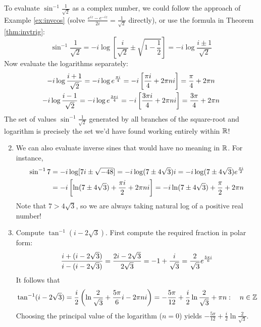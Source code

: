\begin{examples}{}{}
	\exstart To evaluate $\sin^{-1}\frac 1{\sqrt 2}$ as a complex number, we could follow the approach of Example \ref{ex:invcos} (solve $\frac{e^{iz}-e^{-iz}}{2i}=\frac 1{\sqrt 2}$ directly), or use the formula in Theorem \ref{thm:invtrig}:
  \[
  	\sin^{-1}\frac 1{\sqrt 2} =-i\log\left[\frac i{\sqrt 2}\pm \sqrt{1-\frac 12}\right] =-i\log\frac{i\pm 1}{\sqrt 2}
  \]
  Now evaluate the logarithms separately:
  \begin{gather*}
	  -i\log\frac{i+1}{\sqrt 2} =-i\log e^{\frac{\pi i}{4}} =-i\left[\frac{\pi i}4+2\pi ni\right] =\frac\pi 4+2\pi n\\
	  -i\log\frac{i-1}{\sqrt 2} =-i\log e^{\frac{3\pi i}{4}} =-i\left[\frac{3\pi i}4+2\pi ni\right] =\frac{3\pi}4+2\pi n
  \end{gather*}
  The set of values $\sin^{-1}\frac 1{\sqrt 2}$ generated by all branches of the square-root and logarithm is precisely the set we'd have found working entirely within $\mathbb{R}$!
  
	\begin{enumerate}\setcounter{enumi}{1}
	  \item We can also evaluate inverse sines that would have no meaning in $\mathbb{R}$. For instance,
	  \begin{align*}
	  	\sin^{-1}7&=-i\log[7i\pm\sqrt{-48}] =-i\log(7\pm 4\sqrt 3)i =-i\log (7\pm 4\sqrt 3)e^{\frac{\pi i}{2}}\\
	  	&=-i\left[\ln(7\pm 4\sqrt 3)+\frac{\pi i}2+2\pi ni\right] =-i\ln(7\pm 4\sqrt 3)+\frac\pi 2+2\pi n
	  \end{align*}
	  Note that $7>4\sqrt 3$, so we are always taking natural log of a positive real number!
	  
	  \item\label{ex:taninv} Compute $\tan^{-1}(i-2\sqrt 3)$. First compute the required fraction in polar form:
	  \[
	  	\frac{i+(i-2\sqrt 3)}{i-(i-2\sqrt 3)} =\frac{2i-2\sqrt 3}{2\sqrt 3}=-1+\frac i{\sqrt 3}=\frac 2{\sqrt 3}e^{\frac{5\pi i}{6}}
	  \]
	  It follows that
	  \[
	  	\tan^{-1}(i-2\sqrt 3)=\frac i2\left(\ln\frac 2{\sqrt 3}+\frac{5\pi}6i-2\pi ni\right) =-\frac{5\pi}{12}+\frac i2\ln\frac 2{\sqrt 3}+\pi n:\quad n\in\mathbb{Z}
	  \]
	  Choosing the principal value of the logarithm ($n=0$) yields $-\frac{5\pi}{12}+\frac i2\ln\frac 2{\sqrt 3}$.
	\end{enumerate}
\end{examples}
  

